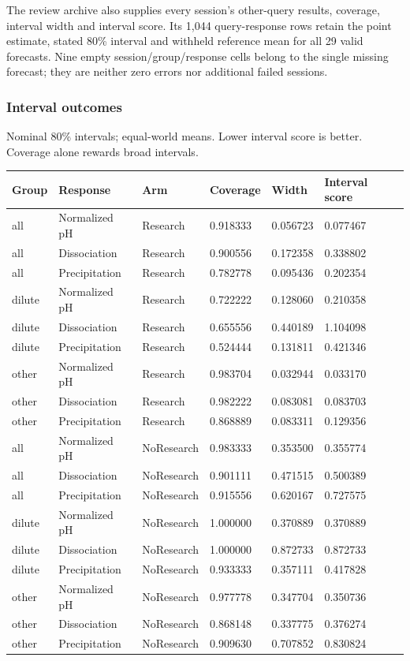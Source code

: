 \documentclass[10pt,a4paper]{article}
\begin{document}
The review archive also supplies every session's other-query results, coverage, interval width and interval score. Its 1,044 query-response rows retain the point estimate, stated 80\% interval and withheld reference mean for all 29 valid forecasts. Nine empty session/group/response cells belong to the single missing forecast; they are neither zero errors nor additional failed sessions.

\subsubsection{Interval outcomes}\label{interval-outcomes}

Nominal 80\% intervals; equal-world means. Lower interval score is better. Coverage alone rewards broad intervals.

{\def\LTcaptype{table} %
\small\begin{longtable}[]{@{}llllll@{}}
\toprule\noalign{}
Group & Response & Arm & Coverage & Width & Interval score \\
\midrule\noalign{}
\endhead
\bottomrule\noalign{}
\endlastfoot
all & Normalized pH & Research & 0.918333 & 0.056723 & 0.077467 \\
all & Dissociation & Research & 0.900556 & 0.172358 & 0.338802 \\
all & Precipitation & Research & 0.782778 & 0.095436 & 0.202354 \\
dilute & Normalized pH & Research & 0.722222 & 0.128060 & 0.210358 \\
dilute & Dissociation & Research & 0.655556 & 0.440189 & 1.104098 \\
dilute & Precipitation & Research & 0.524444 & 0.131811 & 0.421346 \\
other & Normalized pH & Research & 0.983704 & 0.032944 & 0.033170 \\
other & Dissociation & Research & 0.982222 & 0.083081 & 0.083703 \\
other & Precipitation & Research & 0.868889 & 0.083311 & 0.129356 \\
all & Normalized pH & NoResearch & 0.983333 & 0.353500 & 0.355774 \\
all & Dissociation & NoResearch & 0.901111 & 0.471515 & 0.500389 \\
all & Precipitation & NoResearch & 0.915556 & 0.620167 & 0.727575 \\
dilute & Normalized pH & NoResearch & 1.000000 & 0.370889 & 0.370889 \\
dilute & Dissociation & NoResearch & 1.000000 & 0.872733 & 0.872733 \\
dilute & Precipitation & NoResearch & 0.933333 & 0.357111 & 0.417828 \\
other & Normalized pH & NoResearch & 0.977778 & 0.347704 & 0.350736 \\
other & Dissociation & NoResearch & 0.868148 & 0.337775 & 0.376274 \\
other & Precipitation & NoResearch & 0.909630 & 0.707852 & 0.830824 \\
\end{longtable}\normalsize
}
\end{document}
